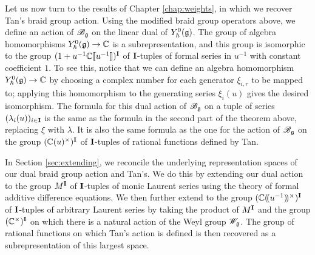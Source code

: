 Let us now turn to the results of Chapter \ref{chap:weights}, in which we recover Tan's braid group action.
Using the modified braid group operators above, we define an action of $\Bg$ on the linear dual of $\Yhg[0]$.
The group of algebra homomorphisms $\Yhg[0]\to\C$ is a subrepresentation, and this group is isomorphic to the group $(1+u^{-1}\C\db{u^{-1}})^\I$ of $\I$-tuples of formal series in $u^{-1}$ with constant coefficient $1$.
To see this, notice that we can define an algebra homomorphism $\Yhg[0]\to\C$ by choosing a complex number for each generator $\xi_{i,r}$ to be mapped to; applying this homomorphism to the generating series $\xi_i(u)$ gives the desired isomorphism.
The formula for this dual action of $\Bg$ on a tuple of series $(\lambda_i(u))_{i\in\I}$ is the same as the formula in the second part of the theorem above, replacing $\xi$ with $\lambda$.
It is also the same formula as the one for the action of $\Bg$ on the group $(\C(u)^\times)^\I$ of $\I$-tuples of rational functions defined by Tan.

In Section \ref{sec:extending}, we reconcile the underlying representation spaces of our dual braid group action and Tan's.
We do this by extending our dual action to the group $M^\I$ of $\I$-tuples of monic Laurent series using the theory of formal additive difference equations.
We then further extend to the group $(\C\dparen{u^{-1}}^\times)^\I$ of $\I$-tuples of arbitrary Laurent series by taking the product of $M^\I$ and the group $(\C^\times)^\I$ on which there is a natural action of the Weyl group $\Wg$.
The group of rational functions on which Tan's action is defined is then recovered as a subrepresentation of this largest space.

